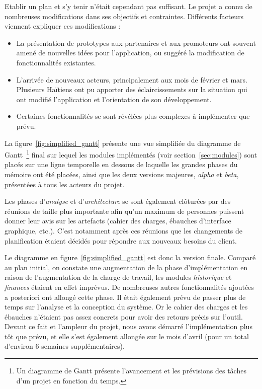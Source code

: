 \documentclass{EPL-master-thesis-covers-FR}
\begin{document}
				Etablir un plan et s'y tenir n'était cependant pas suffisant. Le projet a connu de nombreuses modifications dans ses objectifs et contraintes. Différents facteurs viennent expliquer ces modifications :

				\begin{itemize}
					\item La présentation de prototypes aux partenaires et aux promoteurs ont souvent amené de nouvelles idées pour l'application, ou suggéré la modification de fonctionnalités existantes.
					\item L'arrivée de nouveaux acteurs, principalement aux mois de février et mars. Plusieurs Haïtiens ont pu apporter des éclaircissements sur la situation qui ont modifié l'application et l'orientation de son développement.
					\item Certaines fonctionnalités se sont révélées plus complexes à implémenter que prévu.
				\end{itemize}

				La figure~\ref{fig:simplified_gantt} présente une vue simplifiée du diagramme de Gantt~\footnote{Un diagramme de Gantt présente l'avancement et les prévisions des tâches d'un projet en fonction du temps.} final sur lequel les modules implémentés (voir section~\ref{sec:modules}) sont placés sur une ligne temporelle en dessous de laquelle les grandes phases du mémoire ont été placées, ainsi que les deux versions majeures, \emph{alpha} et \emph{beta}, présentées à tous les acteurs du projet.

				Les phases d'\emph{analyse} et d'\emph{architecture} se sont également clôturées par des réunions de taille plus importante afin qu'un maximum de personnes puissent donner leur avis sur les artefacts (cahier des charges, ébauches d'interface graphique, etc.). C'est notamment après ces réunions que les changements de planification étaient décidés pour répondre aux nouveaux besoins du client.

				Le diagramme en figure~\ref{fig:simplified_gantt} est donc la version finale. Comparé au plan initial, on constate une augmentation de la phase d'implémentation en raison de l'augmentation de la charge de travail, les modules \emph{historique} et \emph{finances} étaient en effet imprévus. De nombreuses autres fonctionnalités ajoutées a posteriori ont allongé cette phase.
				Il était également prévu de passer plus de temps sur l'analyse et la conception du système. Or le cahier des charges et les ébauches n'étaient pas assez concrets pour avoir des retours précis sur l'outil. Devant ce fait et l'ampleur du projet, nous avons démarré l'implémentation plus tôt que prévu, et elle s'est également allongée sur le mois d'avril (pour un total d'environ 6 semaines supplémentaires).
\end{document}
